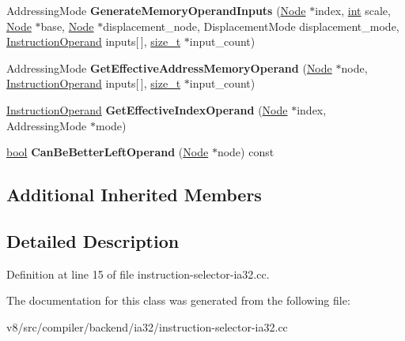 \begin{DoxyCompactItemize}
\mbox{\label{classv8_1_1internal_1_1compiler_1_1IA32OperandGenerator_a6f91c471e7b902ecf9ea11c46ef09322}} 
Addressing\+Mode {\bfseries Generate\+Memory\+Operand\+Inputs} (\mbox{\hyperlink{classv8_1_1internal_1_1compiler_1_1Node}{Node}} $\ast$index, \mbox{\hyperlink{classint}{int}} scale, \mbox{\hyperlink{classv8_1_1internal_1_1compiler_1_1Node}{Node}} $\ast$base, \mbox{\hyperlink{classv8_1_1internal_1_1compiler_1_1Node}{Node}} $\ast$displacement\+\_\+node, Displacement\+Mode displacement\+\_\+mode, \mbox{\hyperlink{classv8_1_1internal_1_1compiler_1_1InstructionOperand}{Instruction\+Operand}} inputs\mbox{[}$\,$\mbox{]}, \mbox{\hyperlink{classsize__t}{size\+\_\+t}} $\ast$input\+\_\+count)
\item 
\mbox{\label{classv8_1_1internal_1_1compiler_1_1IA32OperandGenerator_acb802f165f767140608caabf0f007576}} 
Addressing\+Mode {\bfseries Get\+Effective\+Address\+Memory\+Operand} (\mbox{\hyperlink{classv8_1_1internal_1_1compiler_1_1Node}{Node}} $\ast$node, \mbox{\hyperlink{classv8_1_1internal_1_1compiler_1_1InstructionOperand}{Instruction\+Operand}} inputs\mbox{[}$\,$\mbox{]}, \mbox{\hyperlink{classsize__t}{size\+\_\+t}} $\ast$input\+\_\+count)
\item 
\mbox{\label{classv8_1_1internal_1_1compiler_1_1IA32OperandGenerator_a7d653ca264c5d3284c94e6baf16903a8}} 
\mbox{\hyperlink{classv8_1_1internal_1_1compiler_1_1InstructionOperand}{Instruction\+Operand}} {\bfseries Get\+Effective\+Index\+Operand} (\mbox{\hyperlink{classv8_1_1internal_1_1compiler_1_1Node}{Node}} $\ast$index, Addressing\+Mode $\ast$mode)
\item 
\mbox{\label{classv8_1_1internal_1_1compiler_1_1IA32OperandGenerator_a281442dd23da31e5ad6fa9a74e0ef069}} 
\mbox{\hyperlink{classbool}{bool}} {\bfseries Can\+Be\+Better\+Left\+Operand} (\mbox{\hyperlink{classv8_1_1internal_1_1compiler_1_1Node}{Node}} $\ast$node) const
\end{DoxyCompactItemize}
\subsection*{Additional Inherited Members}


\subsection{Detailed Description}


Definition at line 15 of file instruction-\/selector-\/ia32.\+cc.



The documentation for this class was generated from the following file\+:\begin{DoxyCompactItemize}
\item 
v8/src/compiler/backend/ia32/instruction-\/selector-\/ia32.\+cc\end{DoxyCompactItemize}
